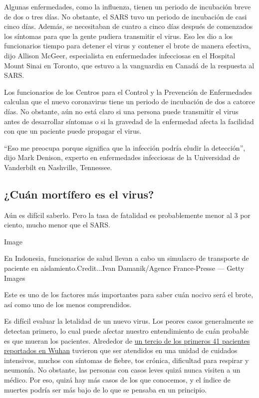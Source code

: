 Algunas enfermedades, como la influenza, tienen un periodo de incubación
breve de dos o tres días. No obstante, el SARS tuvo un periodo de
incubación de casi cinco días. Además, se necesitaban de cuatro a cinco
días después de comenzados los síntomas para que la gente pudiera
transmitir el virus. Eso les dio a los funcionarios tiempo para detener
el virus y contener el brote de manera efectiva, dijo Allison McGeer,
especialista en enfermedades infecciosas en el Hospital Mount Sinai en
Toronto, que estuvo a la vanguardia en Canadá de la respuesta al SARS.

Los funcionarios de los Centros para el Control y la Prevención de
Enfermedades calculan que el nuevo coronavirus tiene un periodo de
incubación de dos a catorce días. No obstante, aún no está claro si una
persona puede transmitir el virus antes de desarrollar síntomas o si la
gravedad de la enfermedad afecta la facilidad con que un paciente puede
propagar el virus.

``Eso me preocupa porque significa que la infección podría eludir la
detección'', dijo Mark Denison, experto en enfermedades infecciosas de
la Universidad de Vanderbilt en Nashville, Tennessee.

\hypertarget{cuuxe1n-mortuxedfero-es-el-virus}{%
\subsection{¿Cuán mortífero es el
virus?}\label{cuuxe1n-mortuxedfero-es-el-virus}}

Aún es difícil saberlo. Pero la tasa de fatalidad es probablemente menor
al 3 por ciento, mucho menor que el SARS.

Image

En Indonesia, funcionarios de salud llevan a cabo un simulacro de
transporte de paciente en aislamiento.Credit...Ivan Damanik/Agence
France-Presse --- Getty Images

Este es uno de los factores más importantes para saber cuán nocivo será
el brote, así como uno de los menos comprendidos.

Es difícil evaluar la letalidad de un nuevo virus. Los peores casos
generalmente se detectan primero, lo cual puede afectar nuestro
entendimiento de cuán probable es que mueran los pacientes. Alrededor de
\href{https://www.thelancet.com/journals/lancet/article/PIIS0140-6736(20)30183-5/fulltext}{un
tercio de los primeros 41 pacientes reportados en Wuhan} tuvieron que
ser atendidos en una unidad de cuidados intensivos, muchos con síntomas
de fiebre, tos crónica, dificultad para respirar y neumonía. No
obstante, las personas con casos leves quizá nunca visiten a un médico.
Por eso, quizá hay más casos de los que conocemos, y el índice de
muertes podría ser más bajo de lo que se pensaba en un principio.

